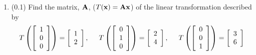 \documentclass[11pt,titlepage,fleqn]{article}
\begin{document}
\begin{enumerate}
\begin{enumerate}
\item (0.1) Find the matrix, $\mbox{${\bf A}$}$, ($T(\mbox{${\bf x}$}) = \mbox{${\bf A}$}\mbox{${\bf x}$}$) of the linear transformation described by
%
\begin{equation*}
T \left( \left[ \begin{array}{r} 1 \\ 0 \\ 0  \end{array} \right] \right) = \left[ \begin{array}{r} 1 \\ 2 \end{array} \right],
\hspace{0.5cm}
T \left( \left[ \begin{array}{r} 0 \\ 1 \\ 0  \end{array} \right] \right) = \left[ \begin{array}{r} 2 \\ 4 \end{array} \right],
\hspace{0.5cm}
T \left( \left[ \begin{array}{r} 0 \\ 0 \\ 1  \end{array} \right] \right) = \left[ \begin{array}{r} 3 \\ 6 \end{array} \right]
\end{equation*}


\end{enumerate}
\end{enumerate}
\end{document}
